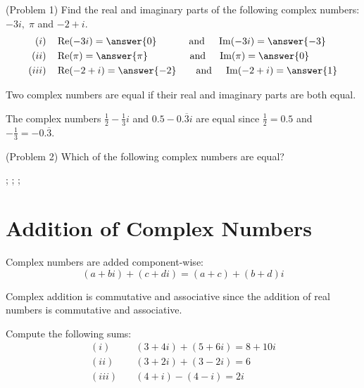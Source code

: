 \documentclass[handout]{ximera}
\begin{document}
\begin{problem}(Problem 1)
Find the real and imaginary parts of the following complex numbers: $-3i,\; \pi$ and $-2+i$.
\begin{align*}
(i) \quad&\Rep(-3i) = \answer{0} \qquad \quad \; \mbox{and} \quad \; \Imp(-3i) = \answer{-3}\\
(ii) \quad&\Rep(\pi) = \answer{\pi} \qquad \qquad \; \mbox{and} \quad \;\Imp(\pi) = \answer{0}\\
(iii) \quad&\Rep(-2+i) = \answer{-2} \qquad \mbox{and} \quad \; \Imp(-2+i) = \answer{1}\\
\end{align*}

\end{problem}



Two complex numbers are equal if their real and imaginary parts are both equal. 



\begin{example}[Example 2]
The complex numbers $\frac12 - \frac13 i$ and $0.5 - 0.{\overline 3}i$ are equal since
$\frac12 = 0.5$ and $-\frac13 = -0.{\overline 3}$.
\end{example}

\begin{problem}(Problem 2)
Which of the following complex numbers are equal?

\begin{selectAll}
;
;
;
\end{selectAll}

\end{problem}



\section{Addition of Complex Numbers}

Complex numbers are added component-wise:
\[
(a+bi) + (c+di) = (a+c) + (b+d)i
\]

Complex addition is commutative and associative since the addition of real numbers is commutative and associative.

\begin{example}[Example 3]
Compute the following sums:
\begin{align*}
(i)& \quad (3+4i) + (5+6i) = 8+10i \\
(ii)& \quad (3+2i) + (3-2i) = 6 \\
(iii)& \quad (4+i) - (4-i) = 2i
\end{align*}

\end{example}
\end{document}
